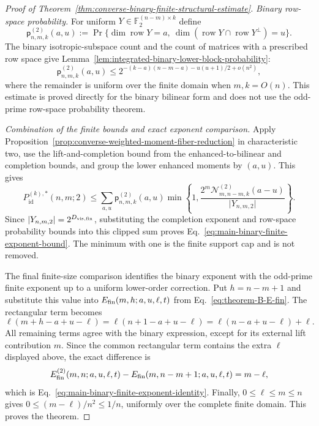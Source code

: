 \documentclass[11pt]{article}
\newcommand{\F}{\mathbb F}
\newcommand{\1}{\mathbf 1}
\theoremstyle{plain}
\theoremstyle{definition}
\theoremstyle{remark}
\begin{document}
\begin{proof}[Proof of Theorem~\ref{thm:converse-binary-finite-structural-estimate}]
\smallskip
\noindent\emph{Binary row-space probability.}
For uniform $Y\in\F_2^{(n-m)\times k}$ define
\begin{equation}
 \mathsf p_{n,m,k}^{(2)}(a,u)
 :=\Pr\{\dim\operatorname{row}Y=a,
 \ \dim(\operatorname{row}Y\cap\operatorname{row}Y^\perp)=u\}.
 \label{eq:theorem-C-unreported-mass-function}
\end{equation}
The binary isotropic-subspace count and the count of matrices with a prescribed
row space give Lemma~\ref{lem:integrated-binary-lower-block-probability}:
\begin{equation}
 \mathsf p_{n,m,k}^{(2)}(a,u)
 \le 2^{-(k-a)(n-m-a)-u(u+1)/2+o(n^2)},
 \label{eq:theorem-C-lower-block-probability}
\end{equation}
where the remainder is uniform over the finite domain when $m,k=O(n)$.
This estimate is proved directly for the binary bilinear form and does not use
the odd-prime row-space probability theorem.

\smallskip
\noindent\emph{Combination of the finite bounds and exact exponent comparison.}
Apply Proposition~\ref{prop:converse-weighted-moment-fiber-reduction} in
characteristic two, use the lift-and-completion bound from the enhanced-to-bilinear and completion bounds, and group the
lower enhanced moments by $(a,u)$.  This gives
\begin{equation}
 P_{\mathrm{id}}^{(k),*}(n,m;2)
 \le\sum_{a,u}\mathsf p_{n,m,k}^{(2)}(a,u)
 \min\left\{1,
 \frac{2^m\mathcal N_{m,n-m,k}^{(2)}(a-u)}{\lvert Y_{n,m,2}\rvert}\right\}.
 \label{eq:theorem-C-finite-weighted-completion}
\end{equation}
Since $\lvert Y_{n,m,2}\rvert=2^{D_{\rm vis,fin}}$, substituting the completion exponent
and row-space probability bounds into this clipped sum proves
Eq.~\eqref{eq:main-binary-finite-exponent-bound}.  The minimum with one is the
finite support cap and is not removed.

The final finite-size comparison identifies the binary exponent with the odd-prime finite exponent up to a uniform lower-order correction.  Put $h=n-m+1$ and substitute this value into
$E_{\rm fin}(m,h;a,u,\ell,t)$ from
Eq.~\eqref{eq:theorem-B-E-fin}.  The
rectangular term becomes
\begin{equation}
 \ell(m+h-a+u-\ell)
 =\ell(n+1-a+u-\ell)
 =\ell(n-a+u-\ell)+\ell.
 \label{eq:theorem-C-rectangular-comparison}
\end{equation}
All remaining terms agree with the binary expression, except for its external
lift contribution $m$.  Since the common rectangular term contains the extra
$\ell$ displayed above, the exact difference is
\begin{equation}
 E_{\rm fin}^{(2)}(m,n;a,u,\ell,t)
 -E_{\rm fin}(m,n-m+1;a,u,\ell,t)=m-\ell,
 \label{eq:theorem-C-exponent-difference}
\end{equation}
which is Eq.~\eqref{eq:main-binary-finite-exponent-identity}.  Finally,
$0\le\ell\le m\le n$ gives
$0\le(m-\ell)/n^2\le1/n$, uniformly over the complete finite domain.  This
proves the theorem.
\end{proof}
\end{document}
